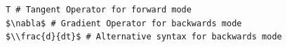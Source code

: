 \documentclass[border=10pt]{standalone}
\begin{document}
\begin{lstlisting}
T # Tangent Operator for forward mode
$\nabla$ # Gradient Operator for backwards mode
$\\frac{d}{dt}$ # Alternative syntax for backwards mode
\end{lstlisting}
\end{document}

